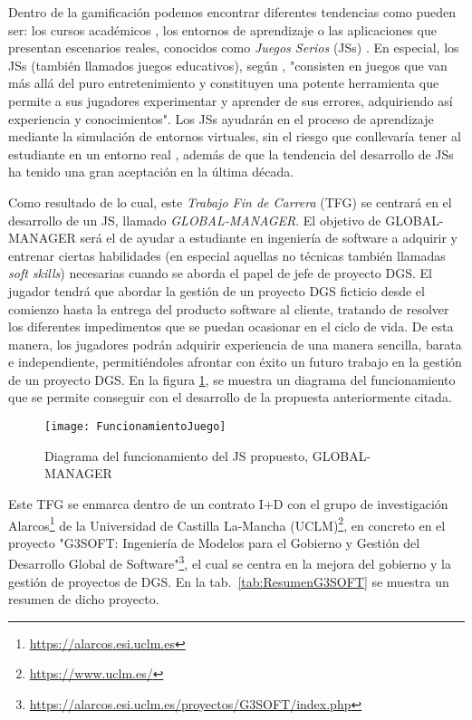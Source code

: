 Dentro de la gamificación podemos encontrar diferentes tendencias como pueden ser: los cursos académicos \cite{murphy2008distance}, los entornos de aprendizaje \cite{burnell2002teaching} o las aplicaciones que presentan escenarios reales, conocidos como \emph{Juegos Serios} (JSs) \cite{meneely2009preparing}. En especial, los JSs (también llamados juegos educativos), según \cite{calderon2018multivocal}, "consisten en juegos que van más allá del puro entretenimiento y constituyen una potente herramienta que permite a sus jugadores experimentar y aprender de sus errores, adquiriendo así experiencia y conocimientos". Los JSs ayudarán en el proceso de aprendizaje mediante la simulación de entornos virtuales, sin el riesgo que conllevaría tener al estudiante en un entorno real \cite{lino2015project, beecham2017best, calderon2018multivocal}, además de que la tendencia del desarrollo de JSs ha tenido una gran aceptación en la última década.

Como resultado de lo cual, este \emph{Trabajo Fin de Carrera} (TFG) se centrará en el desarrollo de un JS, llamado \emph{GLOBAL-MANAGER}. El objetivo de GLOBAL-MANAGER será el de ayudar a estudiante en ingeniería de software a adquirir y entrenar ciertas habilidades (en especial aquellas no técnicas también llamadas \emph{soft skills}) necesarias cuando se aborda el papel de jefe de proyecto DGS. El jugador tendrá que abordar la gestión de un proyecto DGS ficticio desde el comienzo hasta la entrega del producto software al cliente, tratando de resolver los diferentes impedimentos que se puedan ocasionar en el ciclo de vida. De esta manera, los jugadores podrán adquirir experiencia de una manera sencilla, barata e independiente, permitiéndoles afrontar con éxito un futuro trabajo en la gestión de un proyecto DGS. En la figura \ref{fig:funcionamientoJuego}, se muestra un diagrama del funcionamiento que se permite conseguir con el desarrollo de la propuesta anteriormente citada.

\begin{figure}[htb]
	\centering
	\texttt{[image: FuncionamientoJuego]}
	\caption[Funcionamiento de GLOBAL-MANAGER]{Diagrama del funcionamiento del JS propuesto, GLOBAL-MANAGER}
	\label{fig:funcionamientoJuego}
\end{figure}

Este TFG se enmarca dentro de un contrato I+D con el grupo de investigación Alarcos\footnote{\url{https://alarcos.esi.uclm.es}} de la Universidad de Castilla La-Mancha (UCLM)\footnote{\url{https://www.uclm.es/}}, en concreto en el proyecto "G3SOFT: Ingeniería de Modelos para el Gobierno y Gestión del Desarrollo Global de Software"\footnote{\url{https://alarcos.esi.uclm.es/proyectos/G3SOFT/index.php}}, el cual se centra en la mejora del gobierno y la gestión de proyectos de DGS. En la tab.~\ref{tab:ResumenG3SOFT} se muestra un resumen de dicho proyecto.

